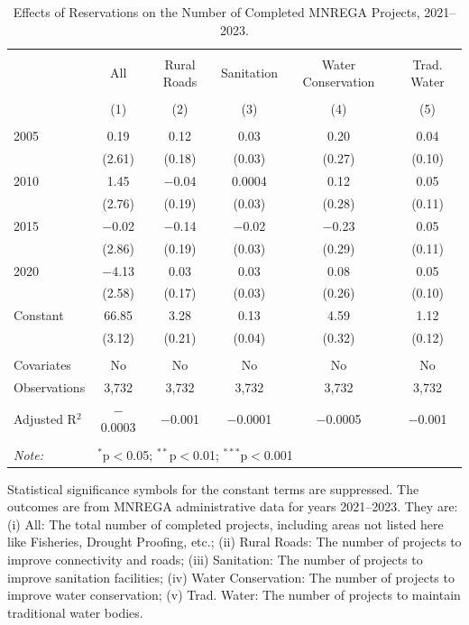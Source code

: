 \begin{table}[!htbp]
\centering
\begin{threeparttable}

  \caption{Effects of Reservations on the Number of Completed MNREGA Projects, 2021--2023.} 
  \label{main_mnrega_2011_2023_additive} 
\scriptsize 
\begin{tabular}{@{\extracolsep{0pt}}lccccc} 
\\[-1.8ex]\hline 
\hline \\[-1.8ex] 
 & All & Rural Roads & Sanitation & Water Conservation & Trad. Water \\ 
\\[-1.8ex] & (1) & (2) & (3) & (4) & (5)\\ 
\hline \\[-1.8ex] 
 2005 & 0.19 & 0.12 & 0.03 & 0.20 & 0.04 \\ 
  & (2.61) & (0.18) & (0.03) & (0.27) & (0.10) \\ 
  2010 & 1.45 & $-$0.04 & 0.0004 & 0.12 & 0.05 \\ 
  & (2.76) & (0.19) & (0.03) & (0.28) & (0.11) \\ 
  2015 & $-$0.02 & $-$0.14 & $-$0.02 & $-$0.23 & 0.05 \\ 
  & (2.86) & (0.19) & (0.03) & (0.29) & (0.11) \\ 
  2020 & $-$4.13 & 0.03 & 0.03 & 0.08 & 0.05 \\ 
  & (2.58) & (0.17) & (0.03) & (0.26) & (0.10) \\ 
  Constant & 66.85 & 3.28 & 0.13 & 4.59 & 1.12 \\ 
  & (3.12) & (0.21) & (0.04) & (0.32) & (0.12) \\ 
 \hline \\[-1.8ex] 
Covariates & No & No & No & No & No \\ 
Observations & 3,732 & 3,732 & 3,732 & 3,732 & 3,732 \\ 
Adjusted R$^{2}$ & $-$0.0003 & $-$0.001 & $-$0.0001 & $-$0.0005 & $-$0.001 \\ 
\hline 
\hline \\[-1.8ex] 
\textit{Note:}  & \multicolumn{5}{l}{$^{*}$p$<$0.05; $^{**}$p$<$0.01; $^{***}$p$<$0.001} \\ 
\end{tabular} 
\begin{tablenotes}[flushleft]
\scriptsize
\item[] Statistical significance symbols for the constant terms are suppressed. The outcomes are from MNREGA administrative data for years 2021--2023. They are: 
(i) All: The total number of completed projects, including areas not listed here like Fisheries, Drought Proofing, etc.;
(ii) Rural Roads: The number of projects to improve connectivity and roads;
(iii) Sanitation: The number of projects to improve sanitation facilities;
(iv) Water Conservation: The number of projects to improve water conservation;
(v) Trad. Water: The number of projects to maintain traditional water bodies.
\end{tablenotes}
\end{threeparttable}
\end{table}
